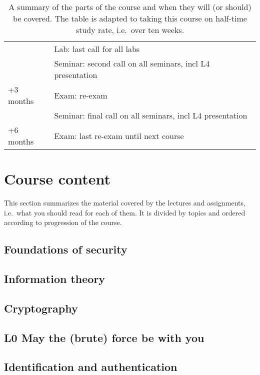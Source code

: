 \begin{table}
\begin{tabular}{lp{9cm}}
    & Lab: last call for all labs\\
    & Seminar: second call on all seminars, incl L4 presentation\\
    \midrule
    +3 months
    & Exam: re-exam\\
    & Seminar: final call on all seminars, incl L4 presentation\\
    \midrule
    +6 months
    & Exam: last re-exam until next course\\
    \bottomrule
  \end{tabular}
  \caption{%
    A summary of the parts of the course and when they will (or should) be 
    covered.
    The table is adapted to taking this course on half-time study rate, i.e.\ 
    over ten weeks.
  }\label{TimeTable}
\end{table}


\section{Course content}

This section summarizes the material covered by the lectures and assignments, 
i.e.\ what you should read for each of them.
It is divided by topics and ordered according to progression of the course.

\subsection{Foundations of security}


\subsection{Information theory}


\subsection{Cryptography}


\subsection{L0 May the (brute) force be with you}


\subsection{Identification and authentication}



